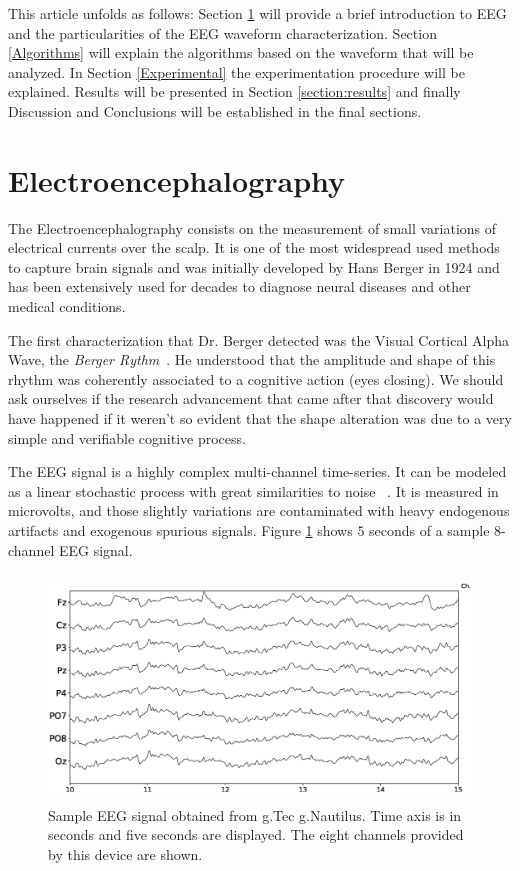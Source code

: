 \documentclass[brainsci,article,submit,moreauthors,pdftex,10pt,a4paper]{mdpi}
\begin{document}
This article unfolds as follows: Section \ref{EEG} will provide a brief introduction to EEG and the particularities of the EEG waveform characterization.  Section \ref{Algorithms} will explain the algorithms based on the waveform that will be analyzed.  In Section \ref{Experimental} the experimentation procedure will be explained.  Results will be presented in Section \ref{section:results} and finally Discussion and Conclusions will be established in the final sections.

\section{Electroencephalography}
\label{EEG}

The Electroencephalography consists on the measurement of small variations of electrical currents over the scalp.  It is one of the most widespread used methods to capture brain signals and was initially developed by Hans Berger in 1924 and has been extensively used for decades to diagnose neural diseases and other medical conditions.

The first characterization that Dr. Berger detected was the Visual Cortical Alpha Wave, the \textit{Berger Rythm}~\citep{Jansen1991}.  He understood that the amplitude and shape of this rhythm was coherently associated to a cognitive action (eyes closing).  
We should ask ourselves if the research advancement that came after that discovery would have happened if it weren't so evident that the shape alteration was due to a very simple and verifiable cognitive process.

The EEG signal is a highly complex multi-channel time-series.  It can be modeled as a linear stochastic process with great similarities to noise ~\citep{Thakor2004}.  It is measured in microvolts, and those slightly variations are contaminated with heavy endogenous artifacts and exogenous spurious signals.  Figure \ref{fig:sampleeeg} shows $5$ seconds of a sample 8-channel EEG signal.
 
\begin{figure}[H]
\centering
\includegraphics[height=6cm,width=12cm]{images/sampleeeg.eps}
\caption{Sample EEG signal obtained from g.Tec g.Nautilus.  Time axis is in seconds and five seconds are displayed.  The eight channels provided by this device are shown.}
\label{fig:sampleeeg}
\end{figure}
\end{document}
